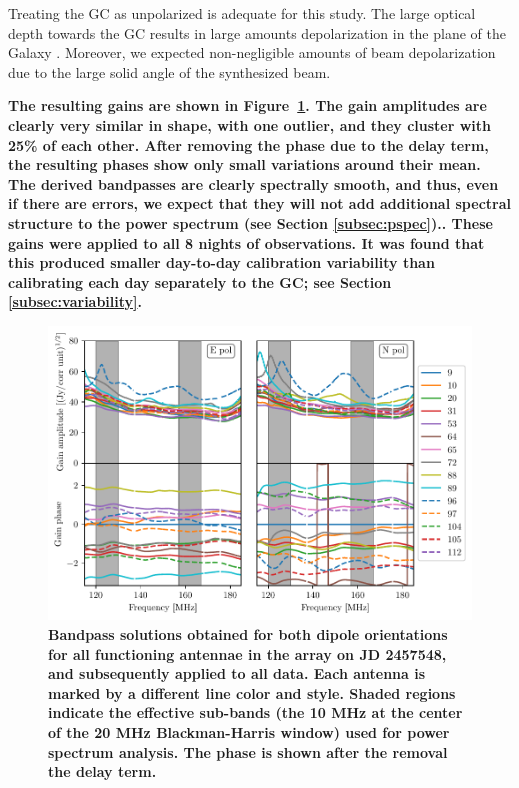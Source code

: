 \documentclass[twocolumn, trackchanges]{aastex61}
\newcommand{\edited}[1]{{\bf \color{red} #1}}
\begin{document}
Treating the GC as unpolarized is adequate for this study. The large optical depth towards the GC \citep{Oppermann.12} results in large amounts depolarization in the plane of the Galaxy \citep{Wolleben.06}. Moreover, we expected non-negligible amounts of beam depolarization due to the large solid angle of the synthesized beam.

\edited{The resulting gains are shown in Figure~\ref{fig:bandpass}.  The gain amplitudes are clearly very similar in shape, with one outlier, and they cluster with 25\% of each other.  After removing the phase due to the delay term, the resulting phases show only small variations around their mean.  The derived bandpasses are clearly spectrally smooth, and thus, even if there are errors, we expect that they will not add additional spectral structure to the power spectrum (see Section \ref{subsec:pspec})..  These gains were applied to all 8 nights of observations. It was found that this produced smaller day-to-day calibration variability than calibrating each day separately to the GC; see Section \ref{subsec:variability}.   
}

\begin{figure}
\centering
\includegraphics[scale=0.5]{gains.pdf}
\caption{\edited{Bandpass solutions obtained for both dipole orientations for all functioning antennae in the array on JD 2457548, and subsequently applied to all data.  Each antenna is marked by a different line color and style. Shaded regions indicate the effective sub-bands (the 10 MHz at the center of the 20 MHz Blackman-Harris window) used for power spectrum analysis.  The phase is shown after the removal the delay term.}}
\label{fig:bandpass}
\end{figure}
\end{document}
